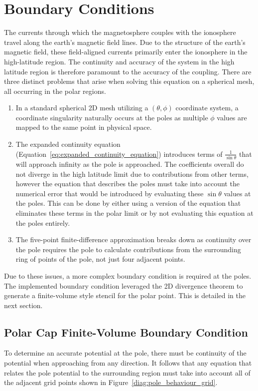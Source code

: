 \section{Boundary Conditions}
\label{sec:polar_boundary}
The currents through which the magnetosphere couples with the ionosphere travel along the earth's magnetic field lines. Due to the structure of the earth's magnetic field, these field-aligned currents primarily enter the ionosphere in the high-latitude region. The continuity and accuracy of the system in the high latitude region is therefore paramount to the accuracy of the coupling. There are three distinct problems that arise when solving this equation on a spherical mesh, all occurring in the polar regions.
\begin{enumerate}
	\item In a standard spherical 2D mesh utilizing a $(\theta,\phi)$ coordinate system, a coordinate singularity naturally occurs at the poles as multiple $\phi$ values are mapped to the same point in physical space.
	\item The expanded continuity equation (Equation~\ref{eq:expanded_continuity_equation}) introduces terms of $\frac{1}{\sin\theta}$ that will approach infinity as the pole is approached. The coefficients overall do not diverge in the high latitude limit due to contributions from other terms, however the equation that describes the poles must take into account the numerical error that would be introduced by evaluating these $\sin\theta$ values at the poles. This can be done by either using a version of the equation that eliminates these terms in the polar limit or by not evaluating this equation at the poles entirely.
	\item The five-point finite-difference approximation breaks down as continuity over the pole requires the pole to calculate contributions from the surrounding ring of points of the pole, not just four adjacent points.
\end{enumerate}
Due to these issues, a more complex boundary condition is required at the poles. The implemented boundary condition leveraged the 2D divergence theorem to generate a finite-volume style stencil for the polar point. This is detailed in the next section.

\subsection{Polar Cap Finite-Volume Boundary Condition}
To determine an accurate potential at the pole, there must be continuity of the potential when approaching from any direction. It follows that any equation that relates the pole potential to the surrounding region must take into account all of the adjacent grid points shown in Figure~\ref{diag:pole_behaviour_grid}.


